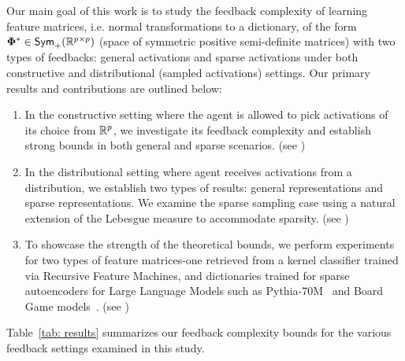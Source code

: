 Our main goal of this work is to study the feedback complexity of learning feature matrices, i.e. normal transformations to a dictionary, of the form $\boldsymbol{\Phi}^* \in \textsf{Sym}_{+}(\mathbb{R}^{p\times p})$ (space of symmetric positive semi-definite matrices) with two types of feedbacks: general activations and sparse activations under both constructive and distributional (sampled activations) settings. Our primary results and contributions are outlined below:
\begin{enumerate}[label={\Roman*.},leftmargin=*]
    \item In the constructive setting where the agent is allowed to pick activations of its choice from $\mathbb{R}^p$, we investigate its feedback complexity and establish strong bounds in both general and sparse scenarios. (see )
    \item In the distributional setting where agent receives activations from a distribution,
    we establish two types of results: general representations and sparse representations. We examine the sparse sampling case using a natural extension of the Lebesgue measure to accommodate sparsity. (see )
    \item To showcase the strength of the theoretical bounds, we perform experiments for two types of feature matrices-one retrieved from a kernel classifier trained via Recursive Feature Machines, and dictionaries trained for sparse autoencoders for Large Language Models such as Pythia-70M~\cite{pythia} and Board Game models~\cite{karvonen2024measuring}. (see )
\end{enumerate}
\fi
Table~\ref{tab: results} summarizes our feedback complexity bounds for the various feedback settings examined in this study. 
\iffalse
